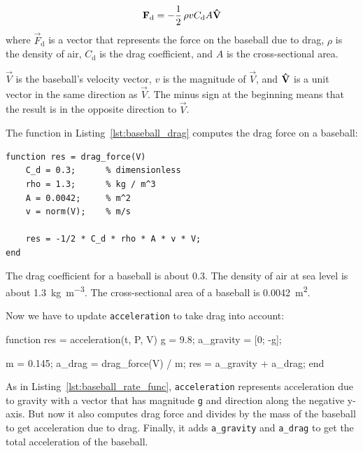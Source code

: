 \begin{equation*}
    \vec{F}_\mathrm{d} = - \frac{1}{2} \, \rho v C_\mathrm{d} A \uvec{V}
\end{equation*}
where $\vec{F}_\mathrm{d}$ is a vector that represents the force on the baseball
due to drag, 
$\rho$ is the density of air, 
$C_\mathrm{d}$ is the drag coefficient, and
$A$ is the cross-sectional area.


$\vec{V}$ is the baseball's velocity vector, $v$ is the magnitude of $\vec{V}$, and $\uvec{V}$ is a unit vector in the same direction as $\vec{V}$.  The minus sign at the beginning means that the result is in the opposite direction to $\vec{V}$.


The function in Listing~\ref{lst:baseball_drag} computes the drag force on a baseball:

\begin{lstlisting}[caption={A function that calculates the drag force on a baseball}, label={lst:baseball_drag}]
 function res = drag_force(V)
    C_d = 0.3;      % dimensionless
    rho = 1.3;      % kg / m^3
    A = 0.0042;     % m^2
    v = norm(V);    % m/s

    res = -1/2 * C_d * rho * A * v * V;
end
\end{lstlisting}
  
The drag coefficient for a baseball is about 0.3.  
The density of air at sea level is about \SI{1.3}{\kilogram\per\meter\cubed}.
The cross-sectional area of a baseball is \SI{0.0042}{\meter\squared}.


Now we have to update \lstinline{acceleration} to take drag into account:

\begin{code}
function res = acceleration(t, P, V)
    g = 9.8;                       %
    a_gravity = [0; -g];

    m = 0.145;                     %
    a_drag = drag_force(V) / m;
    res = a_gravity + a_drag;
end
\end{code}

As in Listing~\ref{lst:baseball_rate_func}, \lstinline{acceleration} represents acceleration due to gravity with a vector that has magnitude \lstinline{g} and direction along the negative y-axis.
But now it also computes drag force and divides by the mass of the baseball to get acceleration due to drag.
Finally, it adds \lstinline{a_gravity} and \lstinline{a_drag} to get the total acceleration of the baseball.


